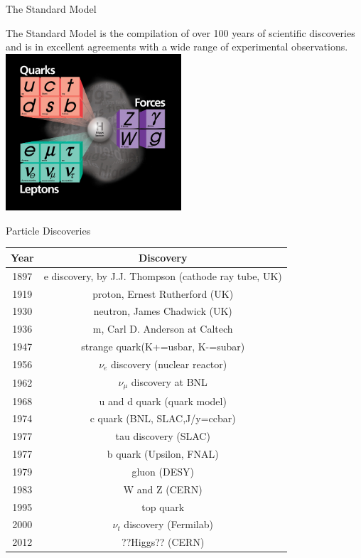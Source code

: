 \begin{frame}{The Standard Model}
\begin{center}
The Standard Model is the compilation of over 100 years of scientific discoveries and is in excellent agreements with a wide range of experimental observations.
\\
\vspace{1em}
    \includegraphics[width=0.49\textwidth]{images/standard_model_particles.jpg}
\end{center}
\end{frame}

\begin{frame}{Particle Discoveries}
  \begin{center}
    \footnotesize
\begin{tabular}{ | c | c |}
  \hline
  Year & Discovery \\ \hline \hline
  1897 & e discovery, by J.J. Thompson (cathode ray tube, UK)\\ \hline
  1919 & proton, Ernest Rutherford (UK)\\ \hline
  1930 & neutron, James Chadwick (UK)\\ \hline
  1936 & m, Carl D. Anderson at Caltech\\ \hline
  1947 & strange quark(K+=usbar, K-=subar)\\ \hline
  1956 & $\nu_e$ discovery (nuclear reactor)\\ \hline
  1962 & $\nu_{\mu}$ discovery at BNL\\ \hline
  1968 & u and d quark (quark model)\\ \hline
  1974 & c quark (BNL, SLAC,J/y=ccbar)\\ \hline
  1977 & tau discovery (SLAC)\\ \hline
  1977 & b quark (Upsilon, FNAL)\\ \hline
  1979 & gluon (DESY)\\ \hline
  1983 & W and Z (CERN) \\ \hline
  1995 & top quark \\ \hline
  2000 & $\nu_t$ discovery (Fermilab) \\ \hline \hline
  2012 & ??Higgs?? (CERN) \\ \hline
\end{tabular}
\end{center}
\end{frame}


